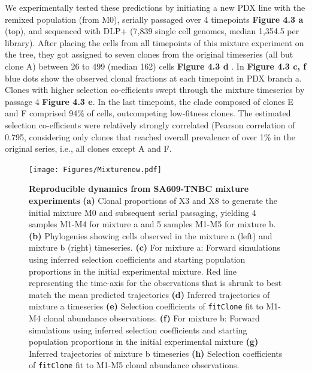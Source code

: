 We experimentally tested these predictions by initiating a new PDX line with the remixed population (from M0), serially passaged over 4 timepoints \textbf{Figure 4.3 a} (top), and sequenced with DLP+ (7,839 single cell genomes, median 1,354.5 per library). After placing the cells from all timepoints of this mixture experiment on the tree, they got assigned to seven clones from the original timeseries (all but clone A) between 26 to 499 (median 162) cells \textbf{Figure 4.3 d} . In \textbf{Figure 4.3 c, f} blue dots show the observed clonal fractions at each timepoint in PDX branch a. Clones with higher selection co-efficients swept through the mixture timeseries by passage 4 \textbf{Figure 4.3 e}. In the last timepoint, the clade composed of clones E and F comprised 94\% of cells, outcompeting low-fitness clones. The estimated selection co-efficients were relatively strongly correlated (Pearson correlation of 0.795, considering only clones that reached overall prevalence of over 1\% in the original series, i.e., all clones except A and F.



\begin{figure}
\centering
\texttt{[image: Figures/Mixturenew.pdf]}
	
\caption[Reproducible dynamics from SA609-TNBC mixture experiments]
	{\small
	\textbf{Reproducible dynamics from SA609-TNBC mixture experiments}
	    \textbf{(a)} Clonal proportions of X3 and X8 to generate the initial mixture M0 and subsequent serial passaging, yielding 4 samples M1-M4 for mixture a and 5 samples
M1-M5 for mixture b.
	    \textbf{(b)} Phylogenies showing cells observed in the mixture a (left) and mixture b (right) timeseries.
	     \textbf{(c)} For mixture a: Forward simulations using inferred selection coefficients and starting population proportions in the initial experimental mixture. Red line representing the time-axis for the observations that is shrunk to best match the mean predicted trajectories
	     \textbf{(d)} Inferred trajectories of mixture a timeseries \textbf{(e)} Selection coefficients of \texttt{fitClone} fit to M1-M4 clonal abundance observations.
 \textbf{(f)} For mixture b: Forward simulations using inferred selection coefficients and starting population proportions in the initial experimental mixture
  \textbf{(g)} Inferred trajectories of mixture b timeseries
	  \textbf{(h)} Selection coefficients of \texttt{fitClone} fit to
M1-M5 clonal abundance observations.    
}
	\label{fig:Untreated timeseries growth curves only}
\end{figure}



